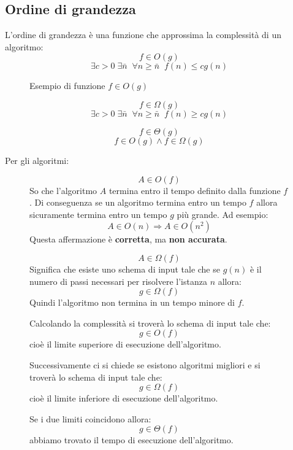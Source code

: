 \documentclass[a4paper]{article}
\begin{document}
\subsection{Ordine di grandezza}
L'ordine di grandezza è una funzione che approssima la complessità di un algoritmo:
\[
f \in O(g)
\] 
\[
  \exists c > 0\; \exists \bar{n}\;\; \forall n \ge \bar{n}\;\; f(n) \le c g(n)
\] 
\begin{figure}[H]
  \centering
  \caption{Esempio di funzione \(f \in O(g)\)}
\end{figure}

\[
f \in \Omega(g)
\] 
\[
  \exists c > 0\; \exists \bar{n}\;\; \forall n \ge \bar{n}\;\; f(n) \ge cg(n)
\] 

\[
f \in \Theta(g)
\] 
\[
  f \in O(g) \land f \in \Omega(g)
\]

\vspace{1em}
\noindent
Per gli algoritmi:
\begin{figure}[H]
  \begin{definition}
    \[
      A \in O(f)
    \] 
    So che l'algoritmo \( A \) termina entro il tempo definito dalla funzione \( f \).
    Di conseguenza se un algoritmo termina entro un tempo \( f \) allora sicuramente
    termina entro un tempo \( g \) più grande. Ad esempio:
    \[
      A \in O(n) \Rightarrow A \in O(n^2)
    \] 
    Questa affermazione è \textbf{corretta}, ma \textbf{non accurata}.

    \vspace{1em}
    \[
      A \in \Omega(f)
    \] 
    Significa che esiste uno schema di input tale che se \( g(n) \) è il numero di
    passi necessari per risolvere l'istanza \( n \) allora:
    \[
      g \in \Omega(f)
    \] 
    Quindi l'algoritmo non termina in un tempo minore di \( f \).

    \vspace{1em}
    \noindent
    Calcolando la complessità si troverà lo schema di input tale che:
    \[
      g \in O(f)
    \]
    cioè il limite superiore di esecuzione dell'algoritmo.

    \noindent
    Successivamente ci si chiede se esistono algoritmi migliori e si 
    troverà lo schema di input tale che:
    \[
      g \in \Omega(f)
    \]
    cioè il limite inferiore di esecuzione dell'algoritmo.

    \noindent
    Se i due limiti coincidono allora:
    \[
      g \in \Theta(f)
    \]
    abbiamo trovato il tempo di esecuzione dell'algoritmo.
  \end{definition}
\end{figure}
\end{document}
